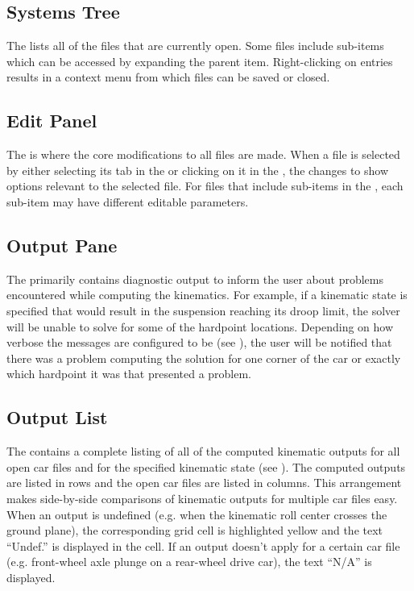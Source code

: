\subsection{Systems Tree} \label{ssec:systemsTree}

The  lists all of the files that are currently open.  Some files include sub-items which can be accessed by expanding the parent item.  Right-clicking on  entries results in a context menu from which files can be saved or closed.

\subsection{Edit Panel} \label{ssec:editPanel}

The  is where the core modifications to all files are made.  When a file is selected by either selecting its tab in the  or clicking on it in the , the  changes to show options relevant to the selected file.  For files that include sub-items in the , each sub-item may have different editable parameters.

\subsection{Output Pane} \label{ssec:outputPane}

The  primarily contains diagnostic output to inform the user about problems encountered while computing the kinematics.  For example, if a kinematic state is specified that would result in the suspension reaching its droop limit, the solver will be unable to solve for some of the hardpoint locations.  Depending on how verbose the messages are configured to be (see ), the user will be notified that there was a problem computing the solution for one corner of the car or exactly which hardpoint it was that presented a problem.

\subsection{Output List} \label{ssec:outputList}

The  contains a complete listing of all of the computed kinematic outputs for all open car files and for the specified kinematic state (see ).  The computed outputs are listed in rows and the open car files are listed in columns.  This arrangement makes side-by-side comparisons of kinematic outputs for multiple car files easy.  When an output is undefined (e.g. when the kinematic roll center crosses the ground plane), the corresponding grid cell is highlighted yellow and the text ``Undef.'' is displayed in the cell.  If an output doesn't apply for a certain car file (e.g. front-wheel axle plunge on a rear-wheel drive car), the text ``N/A'' is displayed.

